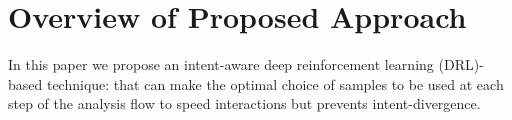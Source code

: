 \vspace{-0.1em}
\section{Overview of Proposed Approach}
In this paper we propose an intent-aware deep reinforcement learning (DRL)-based technique: \name{} that can make the optimal choice of samples to be used at each step of the analysis flow to speed interactions but prevents intent-divergence. 


